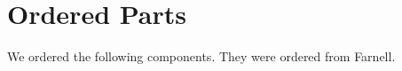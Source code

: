\section{Ordered Parts}\label{app:ordered-parts}
We ordered the following components. They were ordered from
Farnell. 



